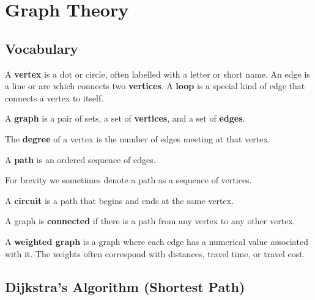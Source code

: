 \chapter{Graph Theory}%
\label{chap:graph-theory}

\section{Vocabulary}%
\label{sec:vocabulary}

\begin{definition}
  A \textbf{vertex} is a dot or circle, often labelled with a letter
  or short name. An edge is a line or arc which connects two
  \textbf{vertices}. A \textbf{loop} is a special kind of edge that
  connects a vertex to itself.
\end{definition}

\begin{definition}
  A \textbf{graph} is a pair of sets, a set of \textbf{vertices}, and
  a set of \textbf{edges}.
\end{definition}

\begin{definition}
  The \textbf{degree} of a vertex is the number of edges meeting at
  that vertex.
\end{definition}

\begin{definition}
  A \textbf{path} is an ordered sequence of edges.
\end{definition}
\begin{note}
  For brevity we sometimes denote a path as a sequence of vertices.
\end{note}

\begin{definition}
  A \textbf{circuit} is a path that begins and ends at the same
  vertex.
\end{definition}

\begin{definition}
  A graph is \textbf{connected} if there is a path from any vertex to
  any other vertex.
\end{definition}

\begin{definition}
  A \textbf{weighted graph} is a graph where each edge has a numerical
  value associated with it. The weights often correspond with
  distances, travel time, or travel cost.
\end{definition}

\section{Dijkstra's Algorithm (Shortest Path)}%
\label{sec:dijkstras-algorithm}

